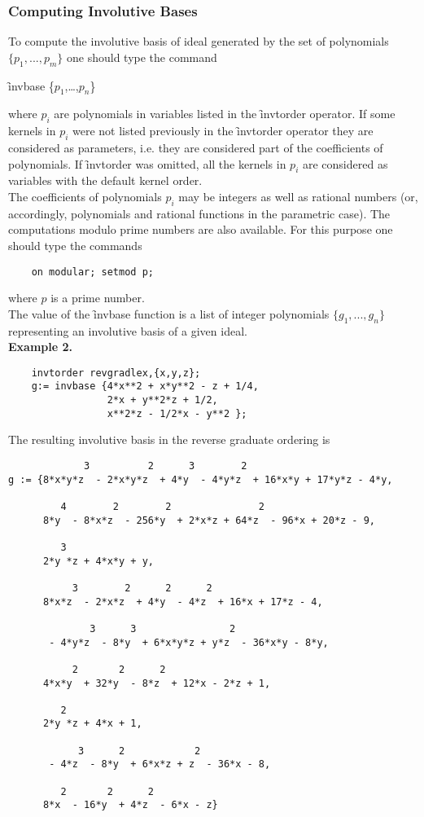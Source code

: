 \subsubsection{Computing Involutive Bases}
\hypertarget{operator:INVBASE}{}
To compute the involutive basis of ideal generated by the set of
polynomials $\{p_1,...,p_m\}$ one should type the command
\begin{syntax}
  \f{invbase} \{$p_{1}$,\ldots,$p_{n}$\}
\end{syntax}
where $p_i$ are polynomials in variables listed in the
\f{invtorder} operator. If some kernels in $p_i$ were not listed
previously in the \f{invtorder} operator they are considered as
parameters, i.e. they are considered part of the coefficients of
polynomials. If \f{invtorder} was omitted, all the kernels
in $p_i$ are considered as variables with the default \REDUCE
kernel order.\\
The coefficients of polynomials $p_i$ may be integers as well as
rational numbers (or, accordingly, polynomials and rational functions
in the parametric case). The computations modulo prime numbers are
also available. For this purpose one should type the \REDUCE commands
\begin{verbatim}
    on modular; setmod p;
\end{verbatim}
where $p$ is a prime number.\\
The value of the \f{invbase} function is a list of integer polynomials
$\{g_1,...,g_n\}$ representing an involutive basis of a given ideal.\\
\textbf{Example 2.}
\begin{verbatim}
    invtorder revgradlex,{x,y,z};
    g:= invbase {4*x**2 + x*y**2 - z + 1/4,
                 2*x + y**2*z + 1/2,
                 x**2*z - 1/2*x - y**2 };
\end{verbatim}
The resulting involutive basis in the reverse graduate ordering is
\begin{verbatim}
             3          2      3        2
g := {8*x*y*z  - 2*x*y*z  + 4*y  - 4*y*z  + 16*x*y + 17*y*z - 4*y,

         4        2        2               2
      8*y  - 8*x*z  - 256*y  + 2*x*z + 64*z  - 96*x + 20*z - 9,

         3
      2*y *z + 4*x*y + y,

           3        2      2      2
      8*x*z  - 2*x*z  + 4*y  - 4*z  + 16*x + 17*z - 4,

              3      3                2
       - 4*y*z  - 8*y  + 6*x*y*z + y*z  - 36*x*y - 8*y,

           2       2      2
      4*x*y  + 32*y  - 8*z  + 12*x - 2*z + 1,

         2
      2*y *z + 4*x + 1,

            3      2            2
       - 4*z  - 8*y  + 6*x*z + z  - 36*x - 8,

         2       2      2
      8*x  - 16*y  + 4*z  - 6*x - z}
\end{verbatim}
